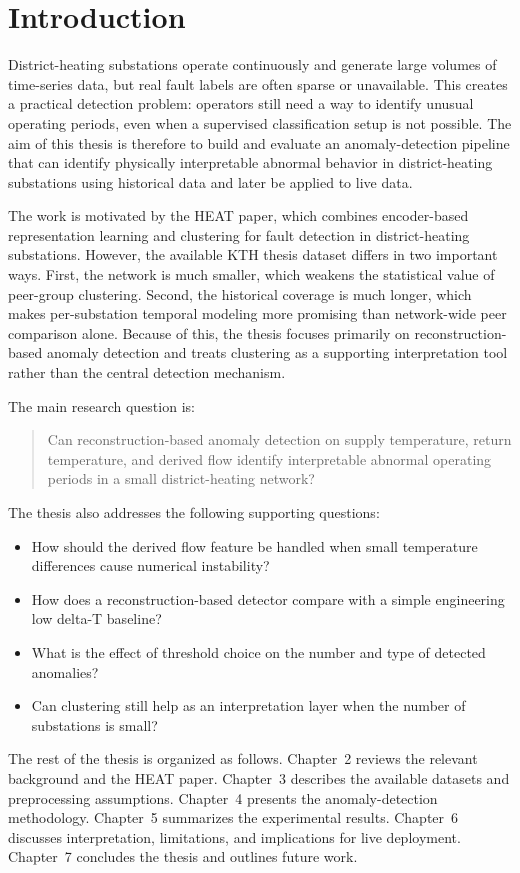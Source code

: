 \section{Introduction}

District-heating substations operate continuously and generate large volumes of time-series data, but real fault labels are often sparse or unavailable. This creates a practical detection problem: operators still need a way to identify unusual operating periods, even when a supervised classification setup is not possible. The aim of this thesis is therefore to build and evaluate an anomaly-detection pipeline that can identify physically interpretable abnormal behavior in district-heating substations using historical data and later be applied to live data.

The work is motivated by the HEAT paper, which combines encoder-based representation learning and clustering for fault detection in district-heating substations. However, the available KTH thesis dataset differs in two important ways. First, the network is much smaller, which weakens the statistical value of peer-group clustering. Second, the historical coverage is much longer, which makes per-substation temporal modeling more promising than network-wide peer comparison alone. Because of this, the thesis focuses primarily on reconstruction-based anomaly detection and treats clustering as a supporting interpretation tool rather than the central detection mechanism.

The main research question is:

\begin{quote}
Can reconstruction-based anomaly detection on supply temperature, return temperature, and derived flow identify interpretable abnormal operating periods in a small district-heating network?
\end{quote}

The thesis also addresses the following supporting questions:

\begin{itemize}
\item How should the derived flow feature be handled when small temperature differences cause numerical instability?
\item How does a reconstruction-based detector compare with a simple engineering low delta-T baseline?
\item What is the effect of threshold choice on the number and type of detected anomalies?
\item Can clustering still help as an interpretation layer when the number of substations is small?
\end{itemize}

The rest of the thesis is organized as follows. Chapter~2 reviews the relevant background and the HEAT paper. Chapter~3 describes the available datasets and preprocessing assumptions. Chapter~4 presents the anomaly-detection methodology. Chapter~5 summarizes the experimental results. Chapter~6 discusses interpretation, limitations, and implications for live deployment. Chapter~7 concludes the thesis and outlines future work.
